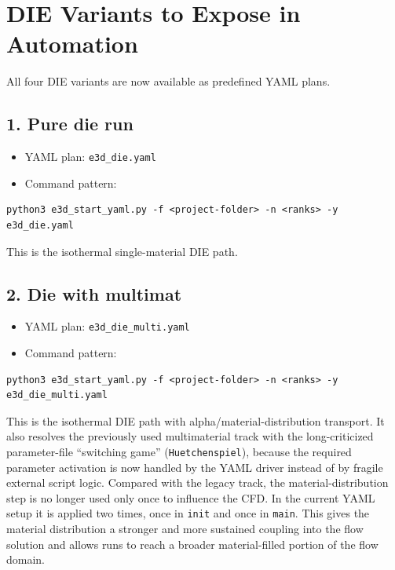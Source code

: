 \documentclass[11pt,a4paper]{article}
\begin{document}
\section*{DIE Variants to Expose in Automation}

All four DIE variants are now available as predefined YAML plans.

\subsection*{1. Pure die run}

\begin{itemize}[leftmargin=*]
  \item YAML plan: \texttt{e3d\_die.yaml}
  \item Command pattern:
\end{itemize}

\begin{verbatim}
python3 e3d_start_yaml.py -f <project-folder> -n <ranks> -y e3d_die.yaml
\end{verbatim}

This is the isothermal single-material DIE path.

\subsection*{2. Die with multimat}

\begin{itemize}[leftmargin=*]
  \item YAML plan: \texttt{e3d\_die\_multi.yaml}
  \item Command pattern:
\end{itemize}

\begin{verbatim}
python3 e3d_start_yaml.py -f <project-folder> -n <ranks> -y e3d_die_multi.yaml
\end{verbatim}

This is the isothermal DIE path with alpha/material-distribution transport. It also resolves the previously used
multimaterial track with the long-criticized parameter-file ``switching game'' (\texttt{Huetchenspiel}), because the
required parameter activation is now handled by the YAML driver instead of by fragile external script logic.
Compared with the legacy track, the material-distribution step is no longer used only once to influence the CFD.
In the current YAML setup it is applied two times, once in \texttt{init} and once in \texttt{main}. This gives the
material distribution a stronger and more sustained coupling into the flow solution and allows runs to reach a
broader material-filled portion of the flow domain.
\end{document}
